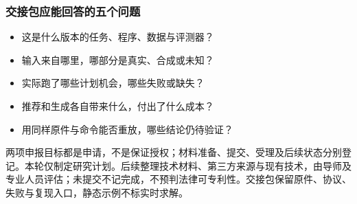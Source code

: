 \documentclass[11pt,a4paper]{article}
\newcommand{\bodytext}[1]{#1\par}
\begin{document}
\endgroup
\subsubsection{交接包应能回答的五个问题}
\begin{itemize}
\item 这是什么版本的任务、程序、数据与评测器？
\item 输入来自哪里，哪部分是真实、合成或未知？
\item 实际跑了哪些计划机会，哪些失败或缺失？
\item 推荐和生成各自带来什么，付出了什么成本？
\item 用同样原件与命令能否重放，哪些结论仍待验证？
\end{itemize}
\bodytext{两项申报目标都是申请，不是保证授权；材料准备、提交、受理及后续状态分别登记。本轮仅制定研究计划。后续整理技术材料、第三方来源与现有技术，由导师及专业人员评估；未提交不记完成，不预判法律可专利性。交接包保留原件、协议、失败与复现入口，静态示例不标实时求解。}
\clearpage
\hypertarget{part_8}{}
\end{document}
